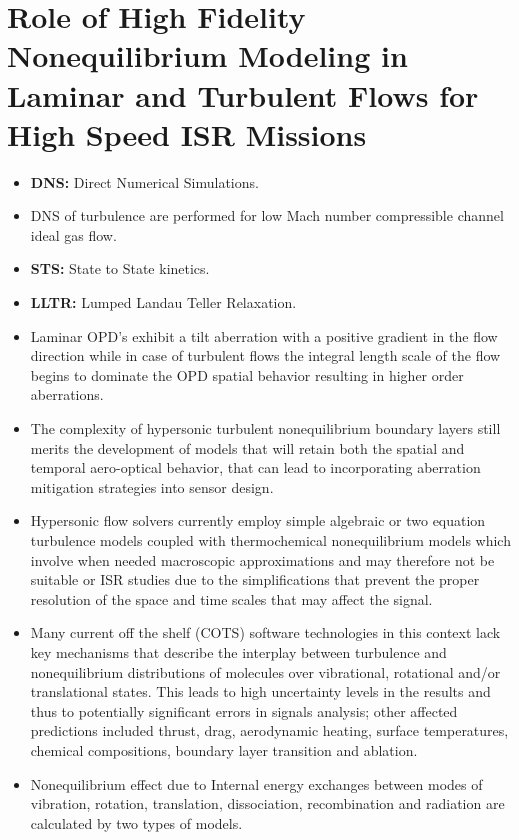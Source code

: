     \section{Role of High Fidelity Nonequilibrium Modeling in Laminar and Turbulent Flows for High Speed ISR Missions \cite{vogiatzis:tp:2016}}
        \begin{itemize}
            \item \textbf{DNS:} Direct Numerical Simulations.
            \item DNS of turbulence are performed for low Mach number compressible channel ideal gas flow. 
            \item \textbf{STS:} State to State kinetics. 
            \item \textbf{LLTR:} Lumped Landau Teller Relaxation.
            \item Laminar OPD's exhibit a tilt aberration with a positive gradient in the flow direction while in case of turbulent flows the integral length scale of the flow begins to dominate the OPD spatial behavior resulting in higher order aberrations.
            \item The complexity of hypersonic turbulent nonequilibrium boundary layers still merits the development of models that will retain both the spatial and temporal aero-optical behavior, that can lead to incorporating aberration mitigation strategies into sensor design.  
            \item Hypersonic flow solvers currently employ simple algebraic or two equation turbulence models coupled with thermochemical nonequilibrium models which involve when needed macroscopic approximations and may therefore not be suitable or ISR studies due to the simplifications that prevent the proper resolution of the space and time scales that may affect the signal. 
            \item Many current off the shelf (COTS) software technologies in this context lack key mechanisms that describe the interplay between turbulence and nonequilibrium distributions of molecules over vibrational, rotational and/or translational states. This leads to high uncertainty levels in the results and thus to potentially significant errors in signals analysis; other affected predictions included thrust, drag, aerodynamic heating, surface temperatures, chemical compositions, boundary layer transition and ablation.
            \item Nonequilibrium effect due to Internal energy exchanges between modes of vibration, rotation, translation, dissociation, recombination and radiation are calculated by two types of models.

\end{itemize}
